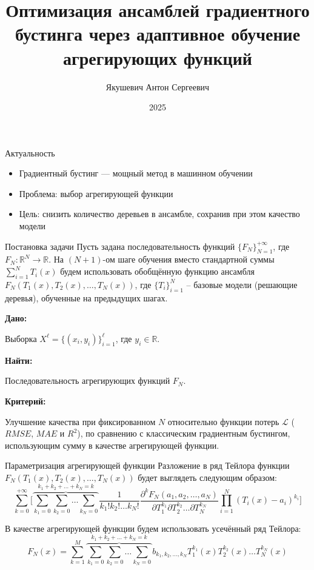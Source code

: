 \documentclass{beamer}
\title{Оптимизация ансамблей градиентного бустинга через адаптивное обучение агрегирующих функций}
\author{Якушевич Антон Сергеевич}
\institute{ВМК МГУ \\[1em] \textit{Научный руководитель}: д.ф.-м.н. Сенько Олег Валентинович}
\date{2025}
\begin{document}
\frame{\titlepage}

\begin{frame}{Актуальность}
    \begin{itemize}
        \item Градиентный бустинг — мощный метод в машинном обучении
        \item Проблема: выбор агрегирующей функции
        \item Цель: снизить количество деревьев в ансамбле, сохранив при этом качество модели
    \end{itemize}
\end{frame}

\begin{frame}{Постановка задачи}
    Пусть задана последовательность функций $\{F_N\}_{N=1}^{+\infty}$, где $F_N: \mathbb{R}^N \to \mathbb{R}$. На $(N+1)$-ом шаге обучения вместо стандартной суммы $\sum_{i=1}^{N} T_i(x)$ будем использовать обобщённую функцию ансамбля $F_N\left(T_1(x), T_2(x), \dots, T_N(x)\right)$, где $\{T_i\}_{i=1}^N$ -- базовые модели (решающие деревья), обученные на предыдущих шагах.

    \vspace{0.5cm}

    \textbf{Дано:}

    Выборка $X^\ell = \{(x_i, y_i)\}_{i=1}^\ell$, где $y_i \in \mathbb{R}$.
    
    \vspace{0.3cm}
    
    \textbf{Найти:}
    
    Последовательность агрегирующих функций $F_N$.
    
    \vspace{0.3cm}
    
    \textbf{Критерий:}
    
    Улучшение качества при фиксированном $N$ относительно функции потерь $\mathscr{L}$ ($RMSE$, $MAE$ и $R^2$), по сравнению с классическим градиентным бустингом, использующим сумму в качестве агрегирующей функции.
\end{frame}


\begin{frame}{Параметризация агрегирующей функции}
    Разложение в ряд Тейлора функции $F_N(T_1(x), T_2(x), \dots, T_N(x))$ будет выглядеть следующим образом:
    \[
        \sum_{k=0}^{+\infty} \Bigg[ \overbrace{\sum_{k_1=0}\sum_{k_2=0}\dots\sum_{k_N=0}}^{k_1 + k_2 + \dots + k_N = k} \frac{1}{k_1!k_2!\dots k_N!}\frac{\partial^k F_N(a_1, a_2, \dots, a_N)}{\partial T_1^{k_1} \partial T_2^{k_2} \dots \partial T_N^{k_N}} \prod_{i=1}^N (T_i(x)-a_i)^{k_i}\Bigg]
    \]

    В качестве агрегирующей функции будем использовать усечённый ряд Тейлора:
    \[
        F_N(x) = \sum_{k=1}^{M} \overbrace{\sum_{k_1=0}\sum_{k_2=0}\dots\sum_{k_N=0}}^{k_1 + k_2 + \dots + k_N = k} b_{k_1, k_2, \dots, k_N} T_1^{k_1}(x) T_2^{k_2}(x) \dots T_N^{k_N}(x)
    \]

\end{frame}
\end{document}

